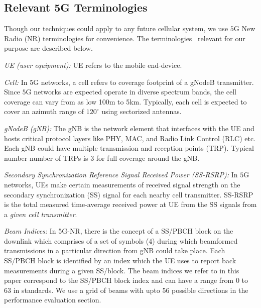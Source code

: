 \documentclass[conference, 10pt]{IEEEtran}
\begin{document}
\begin{NoHyper}



\section{Relevant 5G Terminologies}
\label{sec:bg}
Though our techniques could apply to any future cellular system, we use $5$G New Radio (NR) 
terminologies for convenience. The terminologies~\cite{3gpp38series} relevant for our purpose are described below.

{\em UE (user equipment):} UE refers to the mobile end-device.

{\em Cell:} In $5$G networks, a cell refers to coverage footprint of a gNodeB transmitter. Since $5$G networks are expected operate in diverse spectrum bands, the cell coverage can vary from as low 100m to 5km. Typically, each cell is expected to cover an azimuth range of $120^\circ$ using sectorized antennas.

{\em gNodeB (gNB):} The gNB is the network element that interfaces with the UE and
hosts critical protocol layers like PHY, MAC, and Radio Link Control (RLC) etc. Each
gNB could have multiple transmission and reception points (TRP). Typical number number of TRPs is $3$ for full coverage around the gNB.

{\em Secondary Synchronization Reference Signal Received Power (SS-RSRP):} In $5$G networks, UEs make certain
measurements of received signal strength on the secondary synchronization (SS) signal for each nearby cell transmitter. SS-RSRP is
the total measured time-average received power at UE from the SS signals 
from a {\em given cell transmitter}. 

{\em Beam Indices:} In 5G-NR, there is the concept of a SS/PBCH block on the downlink which comprises of a set of symbols ($4$) during which beamformed transmissions in a particular direction from gNB could take place. Each SS/PBCH block is identified by an index which the UE uses to report back measurements during a given SS/block. The beam indices we refer to in this paper correspond to the SS/PBCH block index and can have a range from $0$ to $63$ in standards. We use a grid of beams with upto $56$ possible directions in the performance evaluation section.  





\end{NoHyper}
\end{document}
